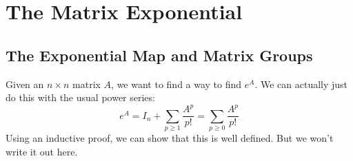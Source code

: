 \section{The Matrix Exponential}
\subsection{The Exponential Map and Matrix Groups}
Given an $n \times n$ matrix $A$, we want to find a way to find $e^A$. We can actually
just do this with the usual power series:
\begin{equation}\label{eq:1}
    e^A = I_n + \sum_{p \ge 1} \frac{A^p}{p!} = \sum_{p \ge 0} \frac{A^p}{p!}
\end{equation}
Using an inductive proof, we can show that this is well defined. But we won't write
it out here.



